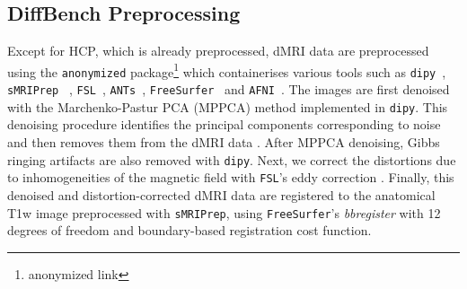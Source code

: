 \subsection{DiffBench Preprocessing}
Except for HCP, which is already preprocessed, dMRI data are preprocessed using the \texttt{anonymized} package\footnote{anonymized link} which containerises  
 various tools such as \texttt{dipy}~\cite{Garyfallidis2014}, \texttt{sMRIPrep}~\cite{esteban2019fmriprep}%
 , \texttt{FSL}~\cite{Smith2004}, 
\texttt{ANTs}~\cite{Avants2009}, \texttt{FreeSurfer}~\cite{Dale1999a} and \texttt{AFNI}~\cite{Cox1996}.
%
The images are first denoised with the Marchenko-Pastur PCA (MPPCA) method \cite{Veraart2016a,Cordero-Grande2019} implemented in
\texttt{dipy}.
%
This denoising procedure identifies the principal components corresponding to noise and then removes them from the dMRI data \cite{Veraart2016a}.
%
After MPPCA denoising, Gibbs ringing artifacts \cite{Veraart2016b} are also removed with \texttt{dipy}.
%
Next, we correct the distortions due to inhomogeneities of the magnetic field with \texttt{FSL}'s eddy correction \cite{Andersson2016}.
%
Finally, this denoised and distortion-corrected dMRI data are registered to the anatomical T1w image preprocessed with \texttt{sMRIPrep}, using \texttt{FreeSurfer}'s \emph{bbregister} \cite{greve2009accurate} with 12 degrees of freedom and boundary-based registration cost function.

